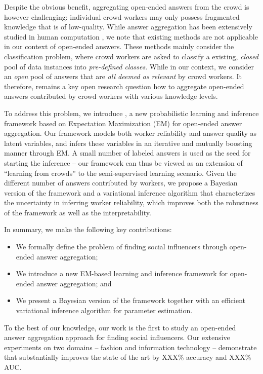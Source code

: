 Despite the obvious benefit, aggregating open-ended answers from the crowd is however challenging: individual crowd workers may only possess fragmented knowledge that is of low-quality. While answer aggregation has been extensively studied in human computation \cite{dawid1979maximum,whitehill2009whose,ZhengLLSC17}, we note that existing methods are not applicable in our context of open-ended answers. These methods mainly consider the classification problem, where crowd workers are asked to classify a existing, \emph{closed} pool of data instances into \emph{pre-defined classes}. While in our context, we consider an \emph{open} pool of answers that are \emph{all deemed as relevant} by crowd workers. It therefore, remains a key open research question how to aggregate open-ended answers contributed by crowd workers with various knowledge levels.

To address this problem, we introduce \sys, a new probabilistic learning and inference framework based on Expectation Maximization (EM) for open-ended answer aggregation. Our framework models both worker reliability and answer quality as latent variables, and   infers these variables in an iterative and mutually boosting manner through EM. A small number of labeled answers is used as the seed for starting the inference -- our framework can thus be viewed as an extension of ``learning from crowds''  \cite{raykar2010learning,yan2010modeling,tian2012learning} to the semi-supervised learning scenario. Given the different number of answers contributed by workers, we propose a Bayesian version of the framework and a variational inference algorithm that characterizes the uncertainty in inferring worker reliability, which improves both the robustness of the framework as well as the interpretability. 

In summary, we make the following key contributions:
\begin{itemize}
\item We formally define the problem of finding social influencers through open-ended answer aggregation;
\item We introduce a new EM-based learning and inference framework for open-ended answer aggregation; and
\item We present a Bayesian version of the framework together with an efficient variational inference algorithm for parameter estimation. 
\end{itemize}

To the best of our knowledge, our work is the first to study an open-ended answer aggregation approach for finding social influencers. Our extensive experiments on two domains -- fashion and information technology -- demonstrate that \sys substantially improves the state of the art by XXX\% accuracy and XXX\% AUC. 